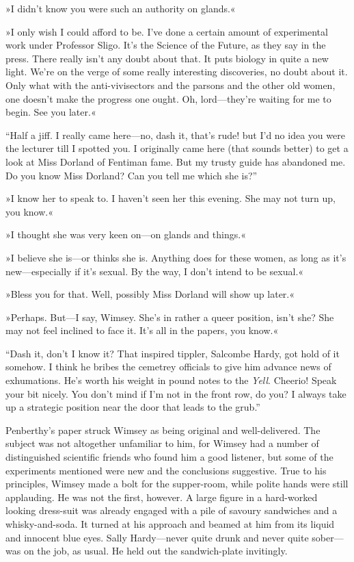 »I didn't know you were such an authority on glands.«

»I only wish I could afford to be. I've done a certain amount of experimental work under Professor Sligo. It's the Science of the Future, as they say in the press. There really isn't any doubt about that. It puts biology in quite a new light. We're on the verge of some really interesting discoveries, no doubt about it. Only what with the anti-vivisectors and the parsons and the other old women, one doesn't make the progress one ought. Oh, lord\allowbreak---\allowbreak they're waiting for me to begin. See you later.«

\enquote{Half a jiff. I really came here\allowbreak---\allowbreak no, dash it, that's rude! but I'd no idea you were the lecturer till I spotted you. I originally came here (that sounds better) to get a look at Miss Dorland of Fentiman fame. But my trusty guide has abandoned me. Do you know Miss Dorland? Can you tell me which she is?}

»I know her to speak to. I haven't seen her this evening. She may not turn up, you know.«

»I thought she was very keen on\allowbreak---\allowbreak on glands and things.«

»I believe she is\allowbreak---\allowbreak or thinks she is. Anything does for these women, as long as it's new\allowbreak---\allowbreak especially if it's sexual. By the way, I don't intend to be sexual.«

»Bless you for that. Well, possibly Miss Dorland will show up later.«

»Perhaps. But\allowbreak---\allowbreak I say, Wimsey. She's in rather a queer position, isn't she? She may not feel inclined to face it. It's all in the papers, you know.«

\enquote{Dash it, don't I know it? That inspired tippler, Salcombe Hardy, got hold of it somehow. I think he bribes the cemetrey officials to give him advance news of exhumations. He's worth his weight in pound notes to the \textit{Yell}. Cheerio! Speak your bit nicely. You don't mind if I'm not in the front row, do you? I always take up a strategic position near the door that leads to the grub.}

Penberthy's paper struck Wimsey as being original and well-delivered. The subject was not altogether unfamiliar to him, for Wimsey had a number of distinguished scientific friends who found him a good listener, but some of the experiments mentioned were new and the conclusions suggestive. True to his principles, Wimsey made a bolt for the supper-room, while polite hands were still applauding. He was not the first, however. A large figure in a hard-worked looking dress-suit was already engaged with a pile of savoury sandwiches and a whisky-and-soda. It turned at his approach and beamed at him from its liquid and innocent blue eyes. Sally Hardy\allowbreak---\allowbreak never quite drunk and never quite sober\allowbreak---\allowbreak was on the job, as usual. He held out the sandwich-plate invitingly.

